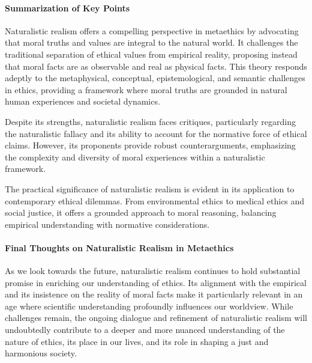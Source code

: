 \documentclass[12pt,a4paper]{article}
\begin{document}
\paragraph{Summarization of Key Points}
Naturalistic realism offers a compelling perspective in metaethics by advocating that moral truths and values are integral to the natural world. It challenges the traditional separation of ethical values from empirical reality, proposing instead that moral facts are as observable and real as physical facts. This theory responds adeptly to the metaphysical, conceptual, epistemological, and semantic challenges in ethics, providing a framework where moral truths are grounded in natural human experiences and societal dynamics.

Despite its strengths, naturalistic realism faces critiques, particularly regarding the naturalistic fallacy and its ability to account for the normative force of ethical claims. However, its proponents provide robust counterarguments, emphasizing the complexity and diversity of moral experiences within a naturalistic framework.

The practical significance of naturalistic realism is evident in its application to contemporary ethical dilemmas. From environmental ethics to medical ethics and social justice, it offers a grounded approach to moral reasoning, balancing empirical understanding with normative considerations.

\paragraph{Final Thoughts on Naturalistic Realism in Metaethics}
As we look towards the future, naturalistic realism continues to hold substantial promise in enriching our understanding of ethics. Its alignment with the empirical and its insistence on the reality of moral facts make it particularly relevant in an age where scientific understanding profoundly influences our worldview. While challenges remain, the ongoing dialogue and refinement of naturalistic realism will undoubtedly contribute to a deeper and more nuanced understanding of the nature of ethics, its place in our lives, and its role in shaping a just and harmonious society.


\printbibliography
\end{document}
